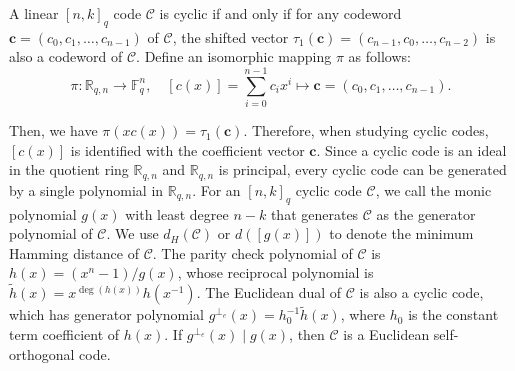 \documentclass[journal]{IEEEtran}
\begin{document}
A linear $\left[n,k\right]_q$ code $\mathscr{C}$ is cyclic if and only if for any codeword $\mathbf{c}=(c_{0}, c_{1}, \ldots, c_{n-1})$ of $\mathscr{C}$, the shifted vector $\tau_1(\mathbf{c})=(c_{n-1}, c_{0}, \ldots, c_{n-2})$ is also a codeword of $\mathscr{C}$. 
Define an isomorphic mapping $\pi$ as follows:  
\begin{equation}  
\pi: \mathbb{R}_{q,n} \rightarrow \mathbb{F}_q^n, \quad [c(x)]=\sum_{i=0}^{n-1} c_{i} x^{i} \mapsto \mathbf{c}=(c_0,c_1,\ldots,c_{n-1}).  
\end{equation}

Then, we have $\pi(xc(x))=\tau_1(\mathbf{c})$. 
Therefore, when studying cyclic codes, $\left[c(x)\right]$ is identified with the coefficient vector $\mathbf{c}$.  
Since a cyclic code is an ideal in the quotient ring $\mathbb{R}_{q,n}$ and $\mathbb{R}_{q,n}$ is principal, every cyclic code can be generated by a single polynomial in $\mathbb{R}_{q,n}$.
For an $\left[n,k\right]_q$ cyclic code $\mathscr{C}$, we call the monic polynomial $g(x)$ with least degree $n-k$ that generates $\mathscr{C}$ as the generator polynomial of $\mathscr{C}$. 
We use $d_H(\mathscr{C})$ or $d(\left[g(x)\right])$ to denote the minimum Hamming distance of $\mathscr{C}$. 
The parity check polynomial of $\mathscr{C}$ is $h(x)=(x^{n}-1)/g(x)$, whose reciprocal polynomial is \( \tilde{h}(x)= x^{\deg(h(x))} h(x^{-1})\).
The Euclidean dual of $\mathscr{C}$ is also a cyclic code, which has generator polynomial $g^{\perp_e}(x)=h_0^{-1} \tilde{h}(x)$, where $h_0$ is the constant term coefficient of $h(x)$. If $g^{\perp_e}(x)\mid g(x)$, then $\mathscr{C}$ is a Euclidean self-orthogonal code.



  
\end{document}
